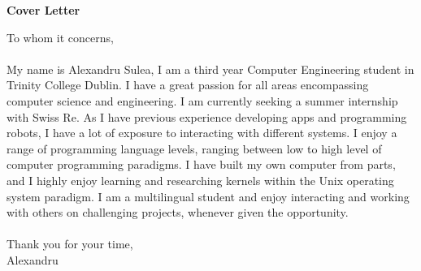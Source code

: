 \documentclass{article}
\begin{document}
\begin{titlepage}
	\begin{center}
	\huge{\bfseries Cover Letter}\\	
	[0mm]
	
	\end{center}
	






		
		
		
\vspace*{2cm}
		
		
		
\noindent To whom it concerns,\\
\\
	My name is Alexandru Sulea, I am a third year Computer Engineering student in Trinity College Dublin. I have a great passion for all areas encompassing computer science and engineering. I am currently seeking a summer internship with Swiss Re. As I have previous experience developing apps and programming robots, I have a lot of exposure to interacting with different systems. I enjoy a range of programming language levels, ranging between low to high level of computer programming paradigms. I have built my own computer from parts, and I highly enjoy learning and researching kernels within the Unix operating system paradigm. I am a multilingual student and enjoy interacting and working with others on challenging projects, whenever given the opportunity.\\
\\
Thank you for your time,\\
Alexandru\\

\end{titlepage}
\end{document}
